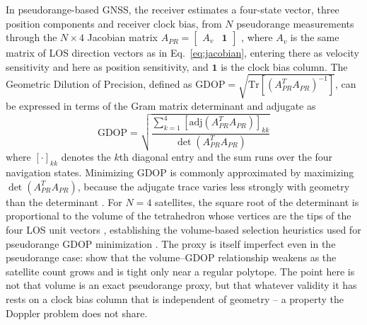 \documentclass[letterpaper,times]{IONconf-v2}
\theoremstyle{plain}
\theoremstyle{remark}
\newcommand{\ones}{\mathbf{1}}
\begin{document}
In pseudorange-based GNSS, the receiver estimates a four-state vector, three position components and receiver clock bias, from $N$ pseudorange measurements through the $N \times 4$ Jacobian matrix $A_{PR} = \begin{bmatrix} A_v & \ones \end{bmatrix}$ \parencite{Kaplan2006,HofmannWellenhof2008}, where $A_v$ is the same matrix of LOS direction vectors as in Eq.~\eqref{eq:jacobian}, entering there as velocity sensitivity and here as position sensitivity, and $\ones$ is the clock bias column. The Geometric Dilution of Precision, defined as $\mathrm{GDOP} = \sqrt{\mathrm{Tr}[(A_{PR}^T A_{PR})^{-1}]}$, can be expressed in terms of the Gram matrix determinant and adjugate as \parencite{BlancoDelgado2017}
%
\begin{equation}\label{eq:gdop_det}
\mathrm{GDOP} = \sqrt{\frac{\sum_{k=1}^{4}
  [\mathrm{adj}(A_{PR}^T A_{PR})]_{kk}}{\det(A_{PR}^T A_{PR})}}
\end{equation}
%
where $[\cdot]_{kk}$ denotes the $k$th diagonal entry and the sum runs over the four navigation states. Minimizing GDOP is commonly approximated by maximizing $\det(A_{PR}^T A_{PR})$, because the adjugate trace varies less strongly with geometry than the determinant \parencite{Parkinson1996,BlancoDelgado2017}. For $N = 4$ satellites, the square root of the determinant is proportional to the volume of the tetrahedron whose vertices are the tips of the four LOS unit vectors \parencite{MassattRudnick1990}, establishing the volume-based selection heuristics used for pseudorange GDOP minimization \parencite[see also][for multi-constellation extensions]{BlancoDelgado2010}. The proxy is itself imperfect even in the pseudorange case: \textcite{BlancoDelgado2017} show that the volume--GDOP relationship weakens as the satellite count grows and is tight only near a regular polytope. The point here is not that volume is an exact pseudorange proxy, but that whatever validity it has rests on a clock bias column that is independent of geometry -- a property the Doppler problem does not share.

\vspace{-10pt}
\end{document}
